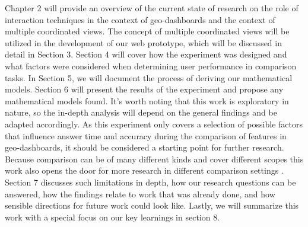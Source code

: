 Chapter 2 will provide an overview of the current state of research on the role of interaction techniques in the context of geo-dashboards
and the context of multiple coordinated views. The concept of multiple coordinated views will be utilized in the development of our web
prototype, which will be discussed in detail in Section 3. Section 4 will cover how the experiment was designed and what factors were
considered when determining user performance in comparison tasks. In Section 5, we will document the process of deriving our mathematical
models. Section 6 will present the results of the experiment and propose any mathematical models found. It's worth noting that this work is
exploratory in nature, so the in-depth analysis will depend on the general findings and be adapted accordingly. As this experiment only
covers a selection of possible factors that influence answer time and accuracy during the comparison of features in geo-dashboards, it should
be considered a starting point for further research. Because comparison can be of many different kinds and cover different scopes this work
also opens the door for more research in different comparison settings \citep*{Gleicher.2018}. Section 7 discusses such limitations in depth,
how our research questions can be answered, how the findings relate to work that was already done, and how sensible directions for future
work could look like. Lastly, we will summarize this work with a special focus on our key learnings in section 8.